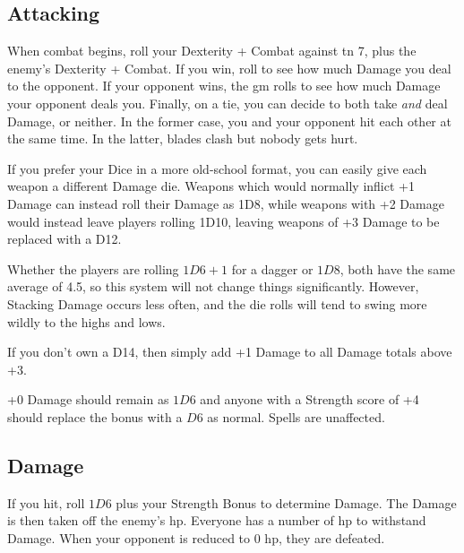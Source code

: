 \begin{multicols}{2}

\subsection{Attacking}
\label{attack}

When combat begins, roll your Dexterity + Combat against \gls{tn} 7, plus the enemy's Dexterity + Combat.
If you win, roll to see how much Damage you deal to the opponent.
If your opponent wins, the \gls{gm} rolls to see how much Damage your opponent deals you.
Finally, on a tie, you can decide to both take \emph{and} deal Damage, or neither.
In the former case, you and your opponent hit each other at the same time.
In the latter, blades clash but nobody gets hurt.

\begin{boxtext}[title=Dicey Damage,float*=b,width=\textwidth]

  If you prefer your Dice in a more old-school format, you can easily give each weapon a different Damage die.
  Weapons which would normally inflict +1 Damage can instead roll their Damage as 1D8, while weapons with +2 Damage would instead leave players rolling 1D10, leaving weapons of +3 Damage to be replaced with a D12.
  
  Whether the players are rolling $1D6+1$ for a dagger or $1D8$, both have the same average of 4.5, so this system will not change things significantly.
  However, Stacking Damage occurs less often, and the die rolls will tend to swing more wildly to the highs and lows.
  
  If you don't own a D14, then simply add +1 Damage to all Damage totals above +3.
  
  +0 Damage should remain as $1D6$ and anyone with a Strength score of +4 should replace the bonus with a $D6$ as normal.
  Spells are unaffected.

\end{boxtext}

\subsection{Damage}

If you hit, roll $1D6$ plus your Strength Bonus to determine Damage.
The Damage is then taken off the enemy's \gls{hp}.
Everyone has a number of \gls{hp} to withstand Damage. When your opponent is reduced to 0 \gls{hp}, they are defeated.


\end{multicols}
